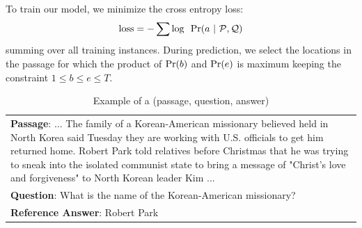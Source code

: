 \documentclass[letterpaper]{article} %
\begin{document}
To train our model, we minimize the cross entropy loss:
\begin{equation}
\textnormal{loss} = - \sum \textnormal{log} ~~ \textnormal{Pr}(a ~|~ \mathcal{P},\mathcal{Q})
\end{equation}
summing over all training instances. During prediction, we select the locations in the passage for which the product of $\textnormal{Pr}(b)$ and $\textnormal{Pr}(e)$ is maximum keeping the constraint $1 \leq b \leq e \leq T$.
\begin{table}[t]
\centering
\begin{tabular}{|p{8.0cm}|}
\hline
\textbf{Passage}: ... The family of a Korean-American missionary believed held in North Korea said Tuesday they are working with U.S. officials to get him returned home. Robert Park told relatives before Christmas that he was trying to sneak into the isolated communist state to bring a message of "Christ's love and forgiveness" to North Korean leader Kim ... \\ 
\textbf{Question}: What is the name of the Korean-American missionary? \\ 
\textbf{Reference Answer}: Robert Park \\ \hline
\end{tabular}
\caption{Example of a (passage, question, answer)}
\label{tab:ex2}
\end{table}
\end{document}
